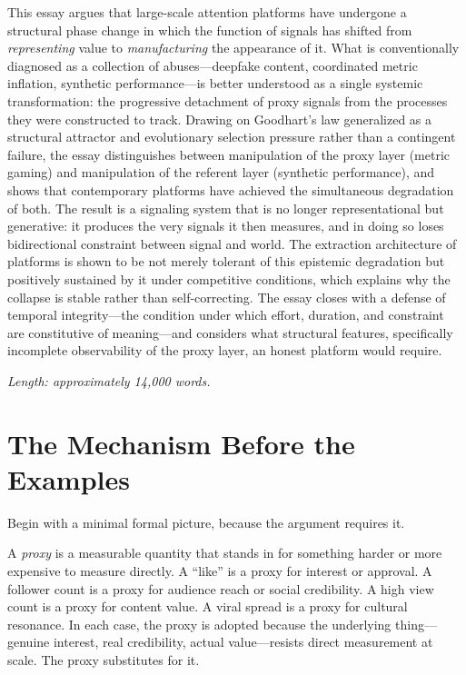 \documentclass[12pt, a4paper]{article}
\begin{document}
This essay argues that large-scale attention platforms have undergone a structural phase change in which the function of signals has shifted from \textit{representing} value to \textit{manufacturing} the appearance of it. What is conventionally diagnosed as a collection of abuses---deepfake content, coordinated metric inflation, synthetic performance---is better understood as a single systemic transformation: the progressive detachment of proxy signals from the processes they were constructed to track. Drawing on Goodhart's law generalized as a structural attractor and evolutionary selection pressure rather than a contingent failure, the essay distinguishes between manipulation of the proxy layer (metric gaming) and manipulation of the referent layer (synthetic performance), and shows that contemporary platforms have achieved the simultaneous degradation of both. The result is a signaling system that is no longer representational but generative: it produces the very signals it then measures, and in doing so loses bidirectional constraint between signal and world. The extraction architecture of platforms is shown to be not merely tolerant of this epistemic degradation but positively sustained by it under competitive conditions, which explains why the collapse is stable rather than self-correcting. The essay closes with a defense of temporal integrity---the condition under which effort, duration, and constraint are constitutive of meaning---and considers what structural features, specifically incomplete observability of the proxy layer, an honest platform would require.

\vspace{1em}
\noindent\textit{Length: approximately 14,000 words.}
\newpage

\tableofcontents
\newpage

\section{The Mechanism Before the Examples}

Begin with a minimal formal picture, because the argument requires it.

A \textit{proxy} is a measurable quantity that stands in for something harder or more expensive to measure directly. A ``like'' is a proxy for interest or approval. A follower count is a proxy for audience reach or social credibility. A high view count is a proxy for content value. A viral spread is a proxy for cultural resonance. In each case, the proxy is adopted because the underlying thing---genuine interest, real credibility, actual value---resists direct measurement at scale. The proxy substitutes for it.
\end{document}
